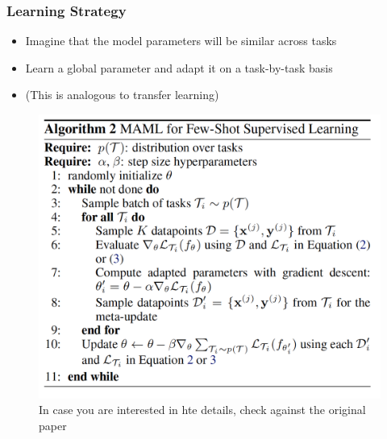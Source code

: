 \documentclass[10pt,mathserif]{beamer}
\begin{document}
\begin{frame}
  \frametitle{Learning Strategy}
 \begin{itemize}
 \item Imagine that the model parameters will be similar across tasks
 \item Learn a global parameter and adapt it on a task-by-task basis
 \item (This is analogous to transfer learning)
 \end{itemize}
\begin{figure}[ht]
  \centering
  \includegraphics[width=0.5\paperwidth]{figure/maml_paper}
  \caption{In case you are interested in hte details, check against the original
    paper
    \label{fig:maml_paper} }
\end{figure}
\end{frame}
\end{document}
